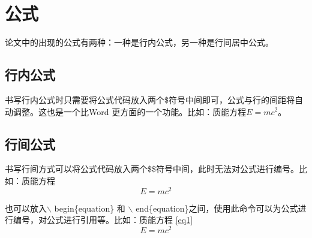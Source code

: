 \section{公式}
论文中的出现的公式有两种：一种是行内公式，另一种是行间居中公式。
\subsection{行内公式}
书写行内公式时只需要将公式代码放入两个\$符号中间即可，公式与行的间距将自动调整。这也是一个比Word 更方面的一个功能。比如：质能方程$E=mc^2$。
\subsection{行间公式}
书写行间方式可以将公式代码放入两个\$\$符号中间，此时无法对公式进行编号。比如：质能方程$$E=mc^2$$\par
也可以放入$\backslash$ begin\{equation\} 和 $\backslash$ end\{equation\}之间，使用此命令可以为公式进行编号，对公式进行引用等。比如：质能方程 \ref{eq1}
\begin{equation}\label{eq1}
E=mc^2
\end{equation}
